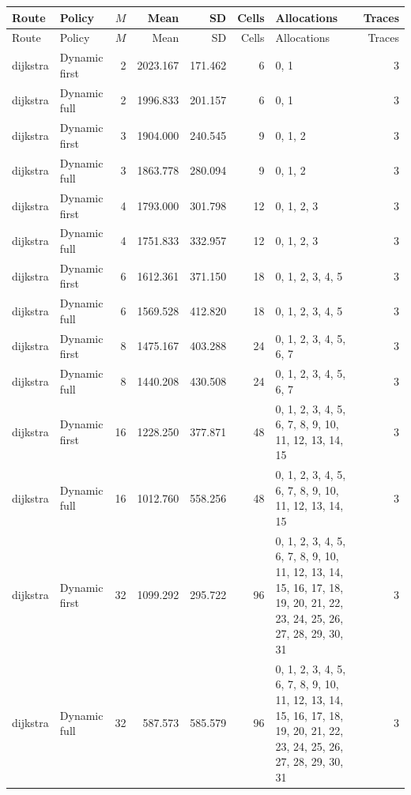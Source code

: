\documentclass[10pt,a4paper]{article}
\begin{document}
\tiny\setlength{\tabcolsep}{2pt}\begin{longtable}{@{}p{23mm}p{29mm}rrrrp{36mm}r@{}}
\toprule Route & Policy & $M$ & Mean & SD & Cells & Allocations & Traces \\ \midrule\endfirsthead
\toprule Route & Policy & $M$ & Mean & SD & Cells & Allocations & Traces \\ \midrule\endhead
\bottomrule\endfoot
dijkstra & Dynamic first & 2 & 2023.167 & 171.462 & 6 & 0, 1 & 3 \\
dijkstra & Dynamic full & 2 & 1996.833 & 201.157 & 6 & 0, 1 & 3 \\
dijkstra & Dynamic first & 3 & 1904.000 & 240.545 & 9 & 0, 1, 2 & 3 \\
dijkstra & Dynamic full & 3 & 1863.778 & 280.094 & 9 & 0, 1, 2 & 3 \\
dijkstra & Dynamic first & 4 & 1793.000 & 301.798 & 12 & 0, 1, 2, 3 & 3 \\
dijkstra & Dynamic full & 4 & 1751.833 & 332.957 & 12 & 0, 1, 2, 3 & 3 \\
dijkstra & Dynamic first & 6 & 1612.361 & 371.150 & 18 & 0, 1, 2, 3, 4, 5 & 3 \\
dijkstra & Dynamic full & 6 & 1569.528 & 412.820 & 18 & 0, 1, 2, 3, 4, 5 & 3 \\
dijkstra & Dynamic first & 8 & 1475.167 & 403.288 & 24 & 0, 1, 2, 3, 4, 5, 6, 7 & 3 \\
dijkstra & Dynamic full & 8 & 1440.208 & 430.508 & 24 & 0, 1, 2, 3, 4, 5, 6, 7 & 3 \\
dijkstra & Dynamic first & 16 & 1228.250 & 377.871 & 48 & 0, 1, 2, 3, 4, 5, 6, 7, 8, 9, 10, 11, 12, 13, 14, 15 & 3 \\
dijkstra & Dynamic full & 16 & 1012.760 & 558.256 & 48 & 0, 1, 2, 3, 4, 5, 6, 7, 8, 9, 10, 11, 12, 13, 14, 15 & 3 \\
dijkstra & Dynamic first & 32 & 1099.292 & 295.722 & 96 & 0, 1, 2, 3, 4, 5, 6, 7, 8, 9, 10, 11, 12, 13, 14, 15, 16, 17, 18, 19, 20, 21, 22, 23, 24, 25, 26, 27, 28, 29, 30, 31 & 3 \\
dijkstra & Dynamic full & 32 & 587.573 & 585.579 & 96 & 0, 1, 2, 3, 4, 5, 6, 7, 8, 9, 10, 11, 12, 13, 14, 15, 16, 17, 18, 19, 20, 21, 22, 23, 24, 25, 26, 27, 28, 29, 30, 31 & 3 \\
\end{longtable}\normalsize\setlength{\tabcolsep}{6pt}
\clearpage
\end{document}
